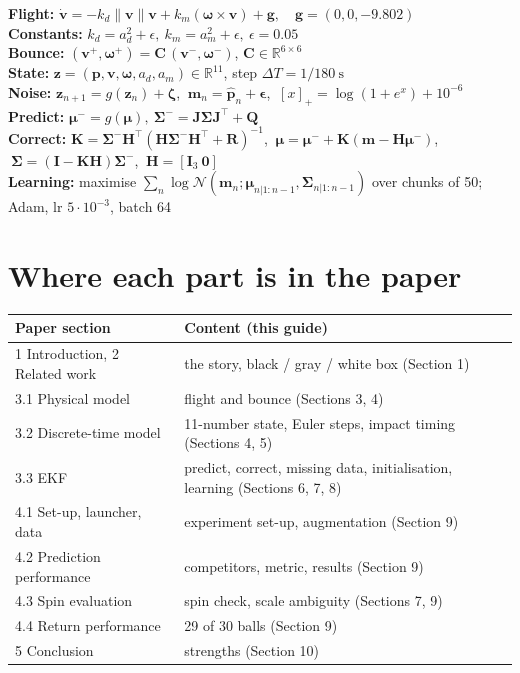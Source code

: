 \documentclass[11pt,a4paper]{article}
\newcommand{\vv}{\mathbf{v}}
\newcommand{\pp}{\mathbf{p}}
\newcommand{\ww}{\boldsymbol{\omega}}
\begin{document}
\begin{eqbox}
\textbf{Flight:} $\dot{\vv}=-k_d\|\vv\|\vv+k_m(\ww\times\vv)+\mathbf g,\quad \mathbf g=(0,0,-9.802)$\\[2pt]
\textbf{Constants:} $k_d=a_d^2+\epsilon,\ k_m=a_m^2+\epsilon,\ \epsilon=0.05$\\[2pt]
\textbf{Bounce:} $(\vv^+,\ww^+)=\mathbf C\,(\vv^-,\ww^-)$, $\mathbf C\in\mathbb R^{6\times6}$\\[2pt]
\textbf{State:} $\mathbf z=(\pp,\vv,\ww,a_d,a_m)\in\mathbb R^{11}$, step $\Delta T=1/180\ \text{s}$\\[2pt]
\textbf{Noise:} $\mathbf z_{n+1}=g(\mathbf z_n)+\boldsymbol\zeta$, $\ \mathbf m_n=\hat{\mathbf p}_n+\boldsymbol\epsilon$, $\ [x]_+=\log(1+e^x)+10^{-6}$\\[2pt]
\textbf{Predict:} $\boldsymbol\mu^-=g(\boldsymbol\mu),\ \boldsymbol\Sigma^-=\mathbf J\boldsymbol\Sigma\mathbf J^\top+\mathbf Q$\\[2pt]
\textbf{Correct:} $\mathbf K=\boldsymbol\Sigma^-\mathbf H^\top(\mathbf H\boldsymbol\Sigma^-\mathbf H^\top+\mathbf R)^{-1}$, $\ \boldsymbol\mu=\boldsymbol\mu^-+\mathbf K(\mathbf m-\mathbf H\boldsymbol\mu^-)$, $\ \boldsymbol\Sigma=(\mathbf I-\mathbf K\mathbf H)\boldsymbol\Sigma^-$, $\ \mathbf H=[\mathbf I_3\ \mathbf 0]$\\[2pt]
\textbf{Learning:} maximise $\sum_n\log\mathcal N(\mathbf m_n;\boldsymbol\mu_{n|1:n-1},\boldsymbol\Sigma_{n|1:n-1})$ over chunks of 50; Adam, lr $5\cdot10^{-3}$, batch 64
\end{eqbox}

\section{Where each part is in the paper}

\begin{table}[htbp]
\centering
\small
\renewcommand{\arraystretch}{1.2}
\begin{tabularx}{\textwidth}{@{}l X@{}}
\toprule
Paper section & Content (this guide) \\
\midrule
1 Introduction, 2 Related work & the story, black / gray / white box (Section 1) \\
3.1 Physical model & flight and bounce (Sections 3, 4) \\
3.2 Discrete-time model & 11-number state, Euler steps, impact timing (Sections 4, 5) \\
3.3 EKF & predict, correct, missing data, initialisation, learning (Sections 6, 7, 8) \\
4.1 Set-up, launcher, data & experiment set-up, augmentation (Section 9) \\
4.2 Prediction performance & competitors, metric, results (Section 9) \\
4.3 Spin evaluation & spin check, scale ambiguity (Sections 7, 9) \\
4.4 Return performance & 29 of 30 balls (Section 9) \\
5 Conclusion & strengths (Section 10) \\
\bottomrule
\end{tabularx}
\end{table}
\end{document}
